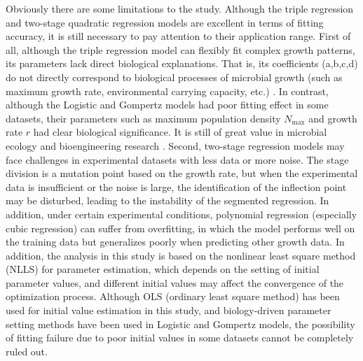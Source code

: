 \documentclass[11pt]{article}
\begin{document}
Obviously there are some limitations to the study. Although the triple regression and two-stage quadratic regression models are excellent in terms of fitting accuracy, it is still necessary to pay attention to their application range. First of all, although the triple regression model can flexibly fit complex growth patterns, its parameters lack direct biological explanations. That is, its coefficients (a,b,c,d) do not directly correspond to biological processes of microbial growth (such as maximum growth rate, environmental carrying capacity, etc.) \citep{MitchellOlds1987}. In contrast, although the Logistic and Gompertz models had poor fitting effect in some datasets, their parameters such as maximum population density $N_{\max}$ and growth rate $r$ had clear biological significance. It is still of great value in microbial ecology and bioengineering research \citep{McKellar1997}. Second, two-stage regression models may face challenges in experimental datasets with less data or more noise. The stage division is a mutation point based on the growth rate, but when the experimental data is insufficient or the noise is large, the identification of the inflection point may be disturbed, leading to the instability of the segmented regression. In addition, under certain experimental conditions, polynomial regression (especially cubic regression) can suffer from overfitting, in which the model performs well on the training data but generalizes poorly when predicting other growth data. In addition, the analysis in this study is based on the nonlinear least square method (NLLS) for parameter estimation, which depends on the setting of initial parameter values, and different initial values may affect the convergence of the optimization process. Although OLS (ordinary least square method) has been used for initial value estimation in this study, and biology-driven parameter setting methods have been used in Logistic and Gompertz models, the possibility of fitting failure due to poor initial values in some datasets cannot be completely ruled out.
\end{document}
